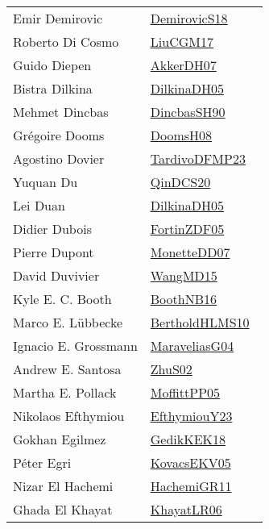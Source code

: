 {\begin{longtable}{p{4cm}p{20cm}}
Emir Demirovic & \href{works/DemirovicS18.pdf}{DemirovicS18}~\cite{DemirovicS18}\\
Roberto Di Cosmo & \href{works/LiuCGM17.pdf}{LiuCGM17}~\cite{LiuCGM17}\\
Guido Diepen & \href{works/AkkerDH07.pdf}{AkkerDH07}~\cite{AkkerDH07}\\
Bistra Dilkina & \href{works/DilkinaDH05.pdf}{DilkinaDH05}~\cite{DilkinaDH05}\\
Mehmet Dincbas & \href{works/DincbasSH90.pdf}{DincbasSH90}~\cite{DincbasSH90}\\
Gr{\'{e}}goire Dooms & \href{works/DoomsH08.pdf}{DoomsH08}~\cite{DoomsH08}\\
Agostino Dovier & \href{works/TardivoDFMP23.pdf}{TardivoDFMP23}~\cite{TardivoDFMP23}\\
Yuquan Du & \href{works/QinDCS20.pdf}{QinDCS20}~\cite{QinDCS20}\\
Lei Duan & \href{works/DilkinaDH05.pdf}{DilkinaDH05}~\cite{DilkinaDH05}\\
Didier Dubois & \href{works/FortinZDF05.pdf}{FortinZDF05}~\cite{FortinZDF05}\\
Pierre Dupont & \href{works/MonetteDD07.pdf}{MonetteDD07}~\cite{MonetteDD07}\\
David Duvivier & \href{works/WangMD15.pdf}{WangMD15}~\cite{WangMD15}\\
Kyle E. C. Booth & \href{works/BoothNB16.pdf}{BoothNB16}~\cite{BoothNB16}\\
Marco E. L{\"{u}}bbecke & \href{works/BertholdHLMS10.pdf}{BertholdHLMS10}~\cite{BertholdHLMS10}\\
Ignacio E. Grossmann & \href{works/MaraveliasG04.pdf}{MaraveliasG04}~\cite{MaraveliasG04}\\
Andrew E. Santosa & \href{works/ZhuS02.pdf}{ZhuS02}~\cite{ZhuS02}\\
Martha E. Pollack & \href{works/MoffittPP05.pdf}{MoffittPP05}~\cite{MoffittPP05}\\
Nikolaos Efthymiou & \href{works/EfthymiouY23.pdf}{EfthymiouY23}~\cite{EfthymiouY23}\\
Gokhan Egilmez & \href{works/GedikKEK18.pdf}{GedikKEK18}~\cite{GedikKEK18}\\
P{\'{e}}ter Egri & \href{works/KovacsEKV05.pdf}{KovacsEKV05}~\cite{KovacsEKV05}\\
Nizar El Hachemi & \href{works/HachemiGR11.pdf}{HachemiGR11}~\cite{HachemiGR11}\\
Ghada El Khayat & \href{works/KhayatLR06.pdf}{KhayatLR06}~\cite{KhayatLR06}\\

\end{longtable}}
